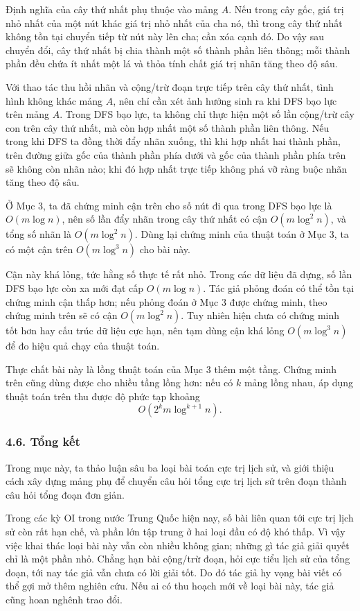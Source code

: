 \documentclass[11pt]{article}
\begin{document}
Định nghĩa của cây thứ nhất phụ thuộc vào mảng \(A\). Nếu trong cây gốc, giá
trị nhỏ nhất của một nút khác giá trị nhỏ nhất của cha nó, thì trong cây thứ
nhất không tồn tại chuyển tiếp từ nút này lên cha; cần xóa cạnh đó. Do vậy
sau chuyển đổi, cây thứ nhất bị chia thành một số thành phần liên thông; mỗi
thành phần đều chứa ít nhất một lá và thỏa tính chất giá trị nhãn tăng theo
độ sâu.

Với thao tác thu hồi nhãn và cộng/trừ đoạn trực tiếp trên cây thứ nhất, tình
hình không khác mảng \(A\), nên chỉ cần xét ảnh hưởng sinh ra khi DFS bạo lực
trên mảng \(A\). Trong DFS bạo lực, ta không chỉ thực hiện một số lần cộng/trừ
cây con trên cây thứ nhất, mà còn hợp nhất một số thành phần liên thông. Nếu
trong khi DFS ta đồng thời đẩy nhãn xuống, thì khi hợp nhất hai thành phần,
trên đường giữa gốc của thành phần phía dưới và gốc của thành phần phía trên
sẽ không còn nhãn nào; khi đó hợp nhất trực tiếp không phá vỡ ràng buộc nhãn
tăng theo độ sâu.

Ở Mục 3, ta đã chứng minh cận trên cho số nút đi qua trong DFS bạo lực là
\(O(m\log n)\), nên số lần đẩy nhãn trong cây thứ nhất có cận
\(O(m\log^2 n)\), và tổng số nhãn là \(O(m\log^2 n)\). Dùng lại chứng minh
của thuật toán ở Mục 3, ta có một cận trên \(O(m\log^3 n)\) cho bài này.

Cận này khá lỏng, tức hằng số thực tế rất nhỏ. Trong các dữ liệu đã dựng,
số lần DFS bạo lực còn xa mới đạt cấp \(O(m\log n)\). Tác giả phỏng đoán có
thể tồn tại chứng minh cận thấp hơn; nếu phỏng đoán ở Mục 3 được chứng minh,
theo chứng minh trên sẽ có cận \(O(m\log^2 n)\). Tuy nhiên hiện chưa có chứng
minh tốt hơn hay cấu trúc dữ liệu cực hạn, nên tạm dùng cận khá lỏng
\(O(m\log^3 n)\) để đo hiệu quả chạy của thuật toán.

Thực chất bài này là lồng thuật toán của Mục 3 thêm một tầng. Chứng minh trên
cũng dùng được cho nhiều tầng lồng hơn: nếu có \(k\) mảng lồng nhau, áp dụng
thuật toán trên thu được độ phức tạp khoảng
\[
  O(2^k m\log^{k+1} n).
\]

\subsubsection*{4.6. Tổng kết}

Trong mục này, ta thảo luận sâu ba loại bài toán cực trị lịch sử, và giới
thiệu cách xây dựng mảng phụ để chuyển câu hỏi tổng cực trị lịch sử trên đoạn
thành câu hỏi tổng đoạn đơn giản.

Trong các kỳ OI trong nước Trung Quốc hiện nay, số bài liên quan tới cực trị
lịch sử còn rất hạn chế, và phần lớn tập trung ở hai loại đầu có độ khó thấp.
Vì vậy việc khai thác loại bài này vẫn còn nhiều không gian; những gì tác giả
giải quyết chỉ là một phần nhỏ. Chẳng hạn bài cộng/trừ đoạn, hỏi cực tiểu
lịch sử của tổng đoạn, tới nay tác giả vẫn chưa có lời giải tốt. Do đó tác
giả hy vọng bài viết có thể gợi mở thêm nghiên cứu. Nếu ai có thu hoạch mới
về loại bài này, tác giả cũng hoan nghênh trao đổi.
\end{document}
